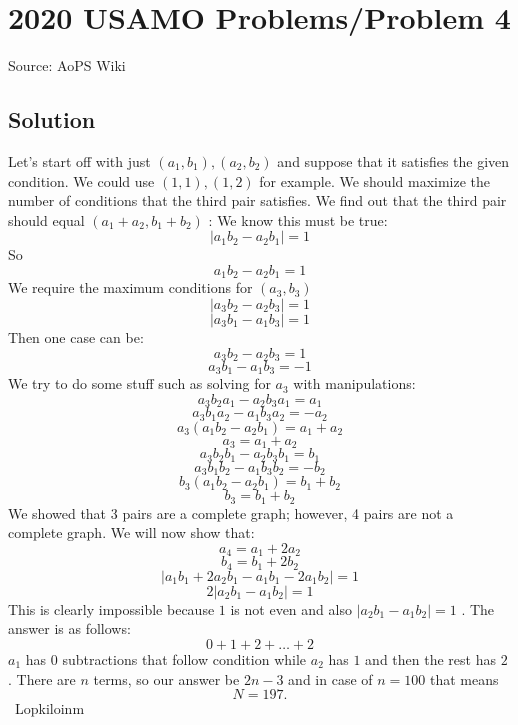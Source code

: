 \documentclass[12pt]{article}
\begin{document}
\section*{{2020 USAMO Problems/Problem 4}}
Source: AoPS Wiki

\subsection*{Solution}
Let's start off with just $(a_1, b_1), (a_2, b_2)$ and suppose that it satisfies the given condition. We could use $(1, 1), (1, 2)$ for example. We should maximize the number of conditions that the third pair satisfies. We find out that the third pair should equal $(a_1+a_2, b_1+b_2)$ : We know this must be true: \[|a_1b_2-a_2b_1| = 1\] So \[a_1b_2-a_2b_1 = 1\] We require the maximum conditions for $(a_3, b_3)$ \[|a_3b_2-a_2b_3| = 1\] \[|a_3b_1-a_1b_3| = 1\] Then one case can be: \[a_3b_2-a_2b_3 = 1\] \[a_3b_1-a_1b_3 = -1\] We try to do some stuff such as solving for $a_3$ with manipulations: \[a_3b_2a_1-a_2b_3a_1 = a_1\] \[a_3b_1a_2-a_1b_3a_2 = -a_2\] \[a_3(a_1b_2-a_2b_1) = a_1+a_2\] \[a_3 = a_1+a_2\] \[a_3b_2b_1-a_2b_3b_1 = b_1\] \[a_3b_1b_2-a_1b_3b_2 = -b_2\] \[b_3(a_1b_2-a_2b_1) = b_1+b_2\] \[b_3 = b_1+b_2\] We showed that 3 pairs are a complete graph; however, 4 pairs are not a complete graph. We will now show that: \[a_4 = a_1+2a_2\] \[b_4 = b_1+2b_2\] \[|a_1b_1+2a_2b_1-a_1b_1-2a_1b_2| = 1\] \[2|a_2b_1-a_1b_2| = 1\] This is clearly impossible because $1$ is not even and also $|a_2b_1-a_1b_2| = 1$ .
The answer is as follows: \[0+1+2+\ldots+2\] $a_1$ has $0$ subtractions that follow condition while $a_2$ has $1$ and then the rest has $2$ .
There are $n$ terms, so our answer be $2n-3$ and in case of $n=100$ that means \[\boxed{N=197}.\] ~Lopkiloinm
\end{document}
